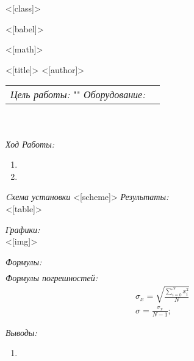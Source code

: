 
<[class]>
\usepackage[utf8]{inputenc}
<[babel]>
\usepackage[OT1]{fontenc}
<[math]>
\usepackage{graphicx}
\usepackage{multirow}
\usepackage[left=2cm,right=2cm,top=2cm,bottom=2cm]{geometry}

<[title]>
<[author]>


\maketitle

\begin{tabular}{p{12cm} l}
\textit{Цель работы:\newline} "" \newline \newline
\textit{Оборудование:\newline}  
\end{tabular}\\ \\

\textit{Ход Работы:}
\begin{enumerate}
  \item 
  \item 
\end{enumerate}

\textit{Cхема установки}
<[scheme]>
\textit{Результаты:\\}
<[table]>

\textit{Графики:\\}
<[img]>

\textit{Формулы:}
\begin{align*}

\end{align*}
\textit{Формулы погрешностей:}
\begin{align*}
  & \sigma_x = \sqrt{\frac{\sum\limits_{i=0}^{N}x_i^2}{N}} \\
  & \sigma = \frac{\sigma_x}{N-1};%
\end{align*}

\textit{Выводы:\\}
\begin{enumerate}
  \item 
\end{enumerate}

